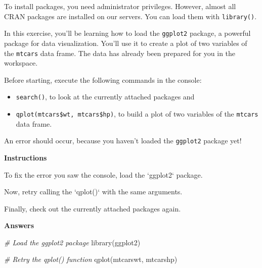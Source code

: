 \documentclass[]{article}
\providecommand{\tightlist}{%
  \setlength{\itemsep}{0pt}\setlength{\parskip}{0pt}}
\newcommand{\hlstr}[1]{\textcolor[rgb]{0.251,0.627,0.251}{#1}}%
\newcommand{\hlcom}[1]{\textcolor[rgb]{0.502,0.502,0.502}{\textit{#1}}}%
\newcommand{\hlstd}[1]{\textcolor[rgb]{0.251,0.251,0.251}{#1}}%
\newcommand{\hlkwc}[1]{\textcolor[rgb]{0.251,0.251,0.251}{#1}}%
\newcommand{\hlkwd}[1]{\textcolor[rgb]{0.878,0.439,0.125}{#1}}%
\newenvironment{Shaded}{\begin{myshaded}}{\end{myshaded}}
\newcommand{\KeywordTok}[1]{\hlkwd{#1}}
\newcommand{\DataTypeTok}[1]{\hlkwc{#1}}
\newcommand{\StringTok}[1]{\hlstr{#1}}
\newcommand{\CommentTok}[1]{\hlcom{#1}}
\newcommand{\NormalTok}[1]{\hlstd{#1}}
\begin{document}
To install packages, you need administrator privileges. However, almost
all CRAN packages are installed on our servers. You can load them with
\texttt{library()}.

In this exercise, you'll be learning how to load the \texttt{ggplot2}
package, a powerful package for data visualization. You'll use it to
create a plot of two variables of the \texttt{mtcars} data frame. The
data has already been prepared for you in the workspace.

Before starting, execute the following commands in the console:

\begin{itemize}
\tightlist
\item
  \texttt{search()}, to look at the currently attached packages and
\item
  \texttt{qplot(mtcars\$wt,\ mtcars\$hp)}, to build a plot of two
  variables of the \texttt{mtcars} data frame.
\end{itemize}

An error should occur, because you haven't loaded the \texttt{ggplot2}
package yet!

\textbf{Instructions}

\begin{Shaded}
\begin{Highlighting}[]
\OperatorTok{*}\StringTok{ }\NormalTok{To fix the error you saw }\NormalTok{ the console, load the }\StringTok{`}\DataTypeTok{ggplot2}\StringTok{`}\NormalTok{ package.}

\OperatorTok{*}\StringTok{ }\NormalTok{Now, retry calling the }\StringTok{`}\DataTypeTok{qplot()}\StringTok{`} \NormalTok{ with the same arguments.}

\OperatorTok{*}\StringTok{ }\NormalTok{Finally, check out the currently attached packages again.}
\end{Highlighting}
\end{Shaded}

\textbf{Answers}

\begin{Shaded}
\begin{Highlighting}[]
\CommentTok{# Load the ggplot2 package}
\KeywordTok{library}\NormalTok{(ggplot2)}

\CommentTok{# Retry the qplot() function}
\KeywordTok{qplot}\NormalTok{(mtcars}\OperatorTok{$}\NormalTok{wt, mtcars}\OperatorTok{$}\NormalTok{hp)}
\end{Highlighting}
\end{Shaded}
\end{document}
